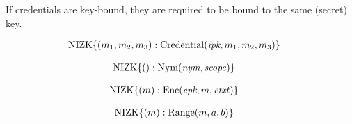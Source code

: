 


\newcommand{\NIZK}{\operatorname{NIZK}}

If credentials are key-bound, they are required to be bound to the same (secret) key. 

\begin{multline}
\NIZK\lbrace(m_1, m_2, m_3): \operatorname{Credential}( \emph{ipk}, m_1, m_2, m_3) \rbrace\shoveleft\
\end{multline}


\begin{multline}
\NIZK\lbrace(): \operatorname{Nym}( \emph{nym}, \mathit{scope}) \rbrace\shoveleft\
\end{multline}

\begin{multline}
\NIZK\lbrace(m): \operatorname{Enc}( \emph{epk}, m, \mathit{ctxt}) \rbrace\shoveleft\
\end{multline}

\begin{multline}
\NIZK\lbrace(m): \operatorname{Range}(m, a , b) \rbrace\shoveleft\
\end{multline}

